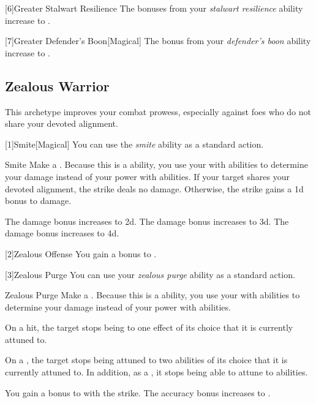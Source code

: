         [6]{Greater Stalwart Resilience} The bonuses from your \textit{stalwart resilience} ability increase to .

        [7]{Greater Defender's Boon}[Magical]
        The bonus from your \textit{defender's boon} ability increase to .

    \subsection{Zealous Warrior}
        This archetype improves your combat prowess, especially against foes who do not share your devoted alignment.

        [1]{Smite}[Magical] You can use the \textit{smite} ability as a standard action.
        \begin{freeability}{Smite}
            Make a .
            Because this is a  ability, you use your  with  abilities to determine your damage instead of your power with  abilities.
            If your target shares your devoted alignment, the strike deals no damage.
            Otherwise, the strike gains a \plus1d bonus to damage.

            \rankline
             The damage bonus increases to \plus2d.
             The damage bonus increases to \plus3d.
             The damage bonus increases to \plus4d.
        \end{freeability}

        [2]{Zealous Offense} You gain a  bonus to .

        [3]{Zealous Purge} You can use your \textit{zealous purge} ability as a standard action.
        \begin{freeability}{Zealous Purge}
            Make a .
            Because this is a  ability, you use your  with  abilities to determine your damage instead of your power with  abilities.

            On a hit, the target stops being  to one effect of its choice that it is currently attuned to.

            On a , the target stops being attuned to two abilities of its choice that it is currently attuned to.
            In addition, as a , it stops being able to attune to abilities.

            \rankline
             You gain a  bonus to  with the strike.
             The accuracy bonus increases to .
        \end{freeability}

